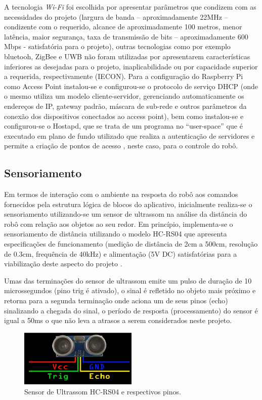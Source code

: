 A tecnologia \textit{Wi-Fi} foi escolhida por apresentar parâmetros que condizem com as necessidades do projeto (largura de banda – aproximadamente
22MHz – condizente com o requerido, alcance de aproximadamente 100 metros, menor latência, maior segurança, taxa de transmissão de bits –
aproximadamente 600 Mbps - satisfatória para o projeto), outras tecnologias como por exemplo bluetooh, ZigBee e UWB não foram utilizadas
por apresentarem características inferiores as desejadas para o projeto, inaplicabilidade ou por capacidade superior a requerida,
respectivamente (IECON). Para a configuração do Raspberry Pi como Access Point instalou-se e configurou-se o protocolo de serviço DHCP
(onde o mesmo utiliza um modelo cliente-servidor, gerenciando automaticamente os endereços de IP, gateway padrão, máscara de sub-rede e
outros parâmetros da conexão dos dispositivos conectados ao access point), bem como instalou-se e configurou-se o Hostapd, que se trata
de um programa no “user-space” que é executado em plano de fundo utilizado que realiza a autenticação de servidores e permite a criação
de pontos de acesso \cite{wireless:2015}, neste caso, para o controle do robô.

\subsection{Sensoriamento}

Em termos de interação com o ambiente na resposta do robô aos comandos fornecidos pela estrutura lógica de blocos do aplicativo,
inicialmente realiza-se o sensoriamento utilizando-se um sensor de ultrassom na análise da distância do robô com relação aos objetos
ao seu redor. Em princípio, implementa-se o sensoriamento de distância utilizando o modelo HC-RS04 que apresenta especificações de
funcionamento (medição de distância de 2cm a 500cm, resolução de 0.3cm, frequência de 40kHz) e alimentação (5V DC) satisfatórias para
a viabilização deste aspecto do projeto \cite{micropik:2015}.

Umas das terminações do sensor de ultrassom emite um pulso de duração de 10 microssegundos (pino trig é ativado), o sinal é 
refletido no objeto mais próximo e retorna para a segunda terminação onde aciona um de seus pinos (echo) sinalizando a chegada do sinal,
o período de resposta (processamento) do sensor é igual a 50ms o que não leva a atrasos a serem considerados neste projeto.

\begin{figure}[H]
    \centering
    \includegraphics[width=0.5\textwidth]{figuras/pinos_ultrassom.eps}
    \caption{Sensor de Ultrassom HC-RS04 e respectivos pinos.}
    \label{fig:pinos_ultrassom}
\end{figure}

